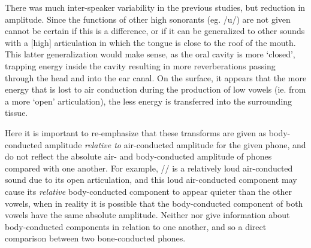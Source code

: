 \DIFaddend There was much inter-speaker variability in the previous studies, but \DIFdelbegin {}\DIFdelend \DIFaddbegin {}\textit{} \DIFaddend reduction in amplitude\DIFdelbegin {}\DIFdelend .  Since the functions of other high sonorants (eg. /u/) are not given \DIFdelbegin {}\DIFdelend \DIFaddbegin {}\DIFaddend cannot be certain if this is a \DIFdelbegin {}\DIFdelend \DIFaddbegin {}\DIFaddend difference, or if it can be generalized to other sounds with a [high] articulation in which the tongue is close to the roof of the mouth.  This latter generalization would make sense, as the oral cavity is more `closed', trapping energy inside the cavity resulting in more reverberations passing through the head and into the ear canal.
%
%
On the surface, it appears that the more energy that is lost to air conduction during the production of low vowels (ie. from a more `open' articulation), the less energy is transferred into the surrounding tissue.

Here it is important to re-emphasize that these transforms are given as body-conducted amplitude \textit{relative to} air-conducted amplitude for the given phone, and do not reflect the absolute air- and body-conducted amplitude of phones compared with one another.  For example, /\DIFdelbegin {}\DIFdelend \DIFaddbegin {}\DIFaddend / is a relatively loud air-conducted sound due to its open articulation, and this loud air-conducted component may cause its \textit{relative} body-conducted component to appear quieter than the other vowels, when in reality it is possible that the body-conducted component of both vowels have the same absolute amplitude.  Neither \cite{bekesy:60} nor \cite{reinfeldt:10} give information about body-conducted components in relation to one another, and so a direct comparison \DIFaddbegin {}\DIFaddend between two bone-conducted phones\DIFdelbegin {}\DIFdelend .

